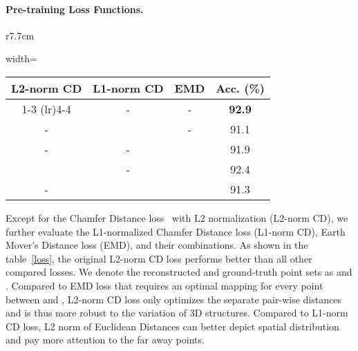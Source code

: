 \documentclass{article}
\makeatletter
\newcommand\tabcaption{\def\@captype{table}\caption}
\makeatother
\begin{document}
\paragraph{Pre-training Loss Functions.}
\begin{wraptable}{r}{7.7cm}
\centering
\small
\vspace{-0.55cm}
\tabcaption{\textbf{Pre-training losses.} `CD' and `EMD' denote Chamfer Distance and Earth Mover’s Distance losses.}
\vspace{0.3cm}
\begin{adjustbox}{width=\linewidth}
	\begin{tabular}{c c c c}
	\toprule
	 L2-norm CD &L1-norm CD &EMD &Acc. (\%)\\
	\cmidrule(lr){1-3} \cmidrule(lr){4-4}
		\rowcolor{gray!8}\checkmark &- &-  &\textbf{92.9}\\
		- &\checkmark &-  &91.1\\
		- &- &\checkmark  &91.9\\
		\checkmark &- &\checkmark  &92.4\\
		- &\checkmark &\checkmark  &91.3\\
	\bottomrule
	\end{tabular}
\end{adjustbox}
\label{loss}
\vspace{-0.2cm}
\end{wraptable}
Except for the Chamfer Distance loss~\cite{chamfer} with L2 normalization (L2-norm CD), we further evaluate the L1-normalized Chamfer Distance loss (L1-norm CD), Earth Mover's Distance loss (EMD), and their combinations. As shown in the table~\ref{loss}, the original L2-norm CD loss performs better than all other compared losses. We denote the reconstructed and ground-truth point sets as  and .
Compared to EMD loss that requires an optimal mapping for every point between  and , L2-norm CD loss only optimizes the separate pair-wise distances and is thus more robust to the variation of 3D structures. Compared to L1-norm CD loss, L2 norm of Euclidean Distances can better depict spatial distribution and pay more attention to the far away points.
\end{document}
